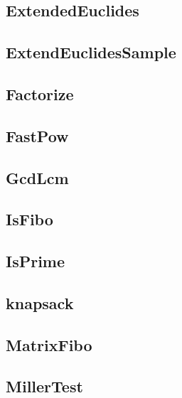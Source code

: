 \subsection{ ExtendedEuclides}
\raggedbottom
\hrulefill
\subsection{ ExtendEuclidesSample}
\raggedbottom
\hrulefill
\subsection{ Factorize}
\raggedbottom
\hrulefill
\subsection{ FastPow}
\raggedbottom
\hrulefill
\subsection{ GcdLcm}
\raggedbottom
\hrulefill
\subsection{ IsFibo}
\raggedbottom
\hrulefill
\subsection{ IsPrime}
\raggedbottom
\hrulefill
\subsection{ knapsack}
\raggedbottom
\hrulefill
\subsection{ MatrixFibo}
\raggedbottom
\hrulefill
\subsection{ MillerTest}
\raggedbottom
\hrulefill
